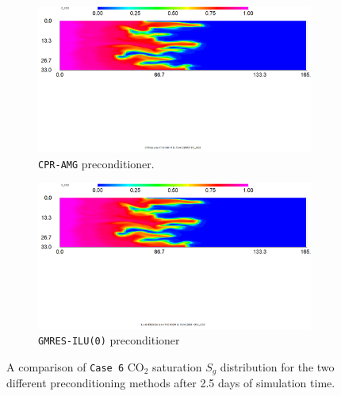\begin{figure}[h!]
\centering
\begin{subfigure}{.5\textwidth}
  \centering
  \includegraphics[width=1\linewidth]{figures/case6_cpr_co2.png}
  \caption{\texttt{CPR-AMG} preconditioner.}
\end{subfigure}%
\begin{subfigure}{.5\textwidth}
  \centering
  \includegraphics[width=1\linewidth]{figures/case6_ilu_co2.png}
  \caption{\texttt{GMRES-ILU(0)} preconditioner}
\end{subfigure}
\caption{A comparison of \texttt{Case 6} CO$_{2}$ saturation $S_{g}$ distribution for the two different preconditioning methods after 2.5 days of simulation time.}
\label{case5sg}
\end{figure}

